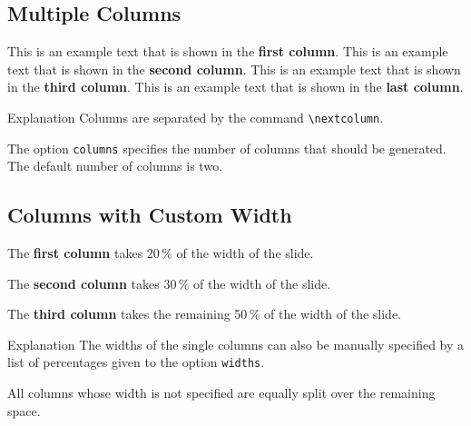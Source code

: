 \documentclass[
	aspectratio=169, %
	8pt, %
]{beamer}
\begin{document}
\subsection{Multiple Columns}
\begin{frame}{\insertsubsection}
	\begin{fancycolumns}[columns=4] %
		This is an example text that is shown in the \textbf{first column}.
	\nextcolumn
		This is an example text that is shown in the \textbf{second column}.
	\nextcolumn
		This is an example text that is shown in the \textbf{third column}.
	\nextcolumn
		This is an example text that is shown in the \textbf{last column}.
	\end{fancycolumns}
	\vfill
	\begin{note}{Explanation}
		Columns are separated by the command \texttt{\textbackslash nextcolumn}.

		The option \texttt{columns} specifies the number of columns that should be generated. The default number of columns is two.
	\end{note}
\end{frame}

\subsection{Columns with Custom Width}
\begin{frame}{\insertsubsection}
	\begin{fancycolumns}[columns=3,widths={20,30}]
		\begin{example}{}
			The \textbf{first column} takes 20\,\% of the width of the slide.
		\end{example}
	\nextcolumn
		\begin{example}{}
			The \textbf{second column} takes 30\,\% of the width of the slide.
		\end{example}
	\nextcolumn
		\begin{example}{}
			The \textbf{third column} takes the remaining 50\,\% of the width of the slide.
		\end{example}
	\end{fancycolumns}
	\vfill
	\begin{note}{Explanation}
		The widths of the single columns can also be manually specified by a list of percentages given to the option \texttt{widths}.

		All columns whose width is not specified are equally split over the remaining space.
	\end{note}
\end{frame}
\end{document}
